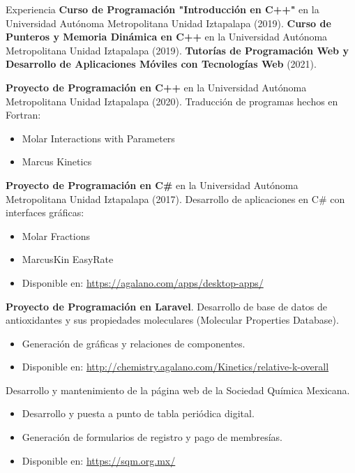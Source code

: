 \begin{rubric}{Experiencia}
    \entry*[] \textbf{Curso de Programación "Introducción en C++"} en la Universidad Autónoma Metropolitana Unidad Iztapalapa (2019).
    \entry*[] \textbf{Curso de Punteros y Memoria Dinámica en C++} en la Universidad Autónoma Metropolitana Unidad Iztapalapa (2019).
    \entry*[] \textbf{Tutorías de Programación Web y Desarrollo de Aplicaciones Móviles con Tecnologías Web} (2021).
    
    \entry*[] \textbf{Proyecto de Programación en C++} en la Universidad Autónoma Metropolitana Unidad Iztapalapa (2020).
       Traducción de programas hechos en Fortran:
       \begin{itemize}
           \item Molar Interactions with Parameters
           \item Marcus Kinetics
       \end{itemize}
    \entry*[] \textbf{Proyecto de Programación en C\#} en la Universidad Autónoma Metropolitana Unidad Iztapalapa (2017).
       Desarrollo de aplicaciones en C\# con interfaces gráficas:
       \begin{itemize}
           \item Molar Fractions
           \item MarcusKin EasyRate
           \item Disponible en: \url{https://agalano.com/apps/desktop-apps/}
       \end{itemize}
    \entry*[] \textbf{Proyecto de Programación en Laravel}.
       Desarrollo de base de datos de antioxidantes y sus propiedades moleculares (Molecular Properties Database).
       \begin{itemize}
           \item Generación de gráficas y relaciones de componentes.
           \item Disponible en: \url{http://chemistry.agalano.com/Kinetics/relative-k-overall}
       \end{itemize}
    \entry*[] Desarrollo y mantenimiento de la página web de la Sociedad Química Mexicana.
       \begin{itemize}
           \item Desarrollo y puesta a punto de tabla periódica digital.
           \item Generación de formularios de registro y pago de membresías.
           \item Disponible en: \url{https://sqm.org.mx/}

\end{itemize}
\end{rubric}
